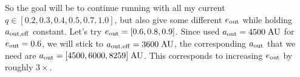 \documentclass[11pt,
        usenames, %
        dvipsnames %
    ]{article}
\begin{document}
So the goal will be to continue running with all my current $q \in [0.2, 0.3,
0.4, 0.5, 0.7, 1.0]$, but also give some different $e_{\rm out}$ while holding
$a_{\rm out, eff}$ constant. Let's try $e_{\rm out} = [0.6, 0.8, 0.9]$. Since
used $a_{\rm out} = 4500\;\mathrm{AU}$ for $e_{\rm out} = 0.6$, we will stick to
$a_{\rm out, eff} = 3600\;\mathrm{AU}$, the corresponding $a_{\rm out}$ that we
need are $a_{\rm out} = [4500, 6000, 8259]\;\mathrm{AU}$. This corresponds to
increasing $e_{\rm out}$ by roughly $3\times$.
\end{document}
